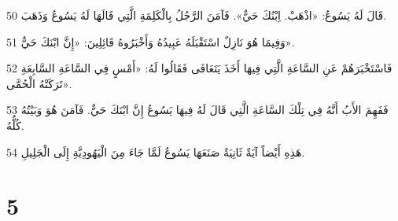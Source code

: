 \par 50 قَالَ لَهُ يَسُوعُ: «اذْهَبْ. اِبْنُكَ حَيٌّ». فَآمَنَ الرَّجُلُ بِالْكَلِمَةِ الَّتِي قَالَهَا لَهُ يَسُوعُ وَذَهَبَ.
\par 51 وَفِيمَا هُوَ نَازِلٌ اسْتَقْبَلَهُ عَبِيدُهُ وَأَخْبَرُوهُ قَائِلِينَ: «إِنَّ ابْنَكَ حَيٌّ».
\par 52 فَاسْتَخْبَرَهُمْ عَنِ السَّاعَةِ الَّتِي فِيهَا أَخَذَ يَتَعَافَى فَقَالُوا لَهُ: «أَمْسٍ فِي السَّاعَةِ السَّابِعَةِ تَرَكَتْهُ الْحُمَّى».
\par 53 فَفَهِمَ الأَبُ أَنَّهُ فِي تِلْكَ السَّاعَةِ الَّتِي قَالَ لَهُ فِيهَا يَسُوعُ إِنَّ ابْنَكَ حَيٌّ. فَآمَنَ هُوَ وَبَيْتُهُ كُلُّهُ.
\par 54 هَذِهِ أَيْضاً آيَةٌ ثَانِيَةٌ صَنَعَهَا يَسُوعُ لَمَّا جَاءَ مِنَ الْيَهُودِيَّةِ إِلَى الْجَلِيلِ.

\chapter{5}

